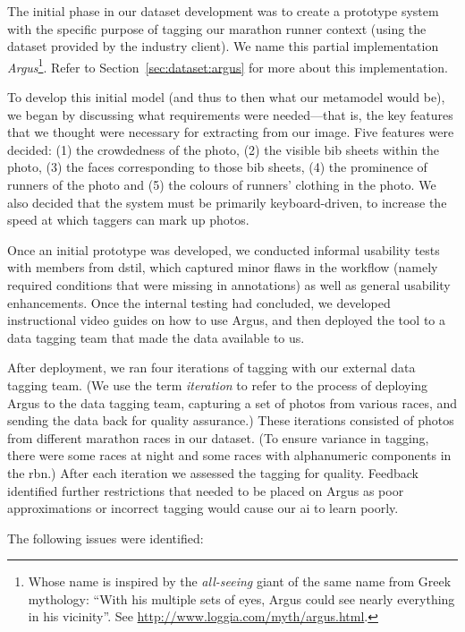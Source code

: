 The initial phase in our dataset development was to create a prototype system with the specific purpose of tagging our marathon runner context (using the dataset provided by the industry client). We name this partial implementation \textit{Argus}\footnote{Whose name is inspired by the \textit{all-seeing} giant of the same name from Greek mythology: ``With his multiple sets of eyes, Argus could see nearly everything in his vicinity''. See \url{http://www.loggia.com/myth/argus.html}.}. Refer to Section~\ref{sec:dataset:argus} for more about this implementation. 

To develop this initial model (and thus to then what our metamodel would be), we began by discussing what requirements were needed---that is, the key features that we thought were necessary for extracting from our image. Five features were decided: (1) the crowdedness of the photo, (2) the visible bib sheets within the photo, (3) the faces corresponding to those bib sheets, (4) the prominence of runners of the photo and (5) the colours of runners' clothing in the photo. We also decided that the system must be primarily keyboard-driven, to increase the speed at which taggers can mark up photos.

Once an initial prototype was developed, we conducted informal usability tests with members from \gls{dstil}, which captured minor flaws in the workflow (namely required conditions that were missing in annotations) as well as general usability enhancements. Once the internal testing had concluded, we developed instructional video guides on how to use Argus, and then deployed the tool to a data tagging team that made the data available to us.

After deployment, we ran four iterations of tagging with our external data tagging team. (We use the term \textit{iteration} to refer to the process of deploying Argus to the data tagging team, capturing a set of photos from various races, and sending the data back for quality assurance.) These iterations consisted of photos from different marathon races in our dataset. (To ensure variance in tagging, there were some races at night and some races with alphanumeric components in the \gls{rbn}.) After each iteration we assessed the tagging for quality. Feedback identified further restrictions that needed to be placed on Argus as poor approximations or incorrect tagging would cause our \gls{ai} to learn poorly. 

The following issues were identified:

